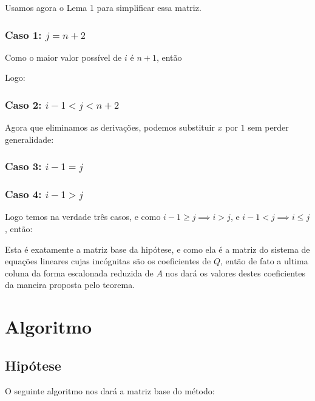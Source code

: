\documentclass[a4paper, 10pt]{article}
\begin{document}
Usamos agora o Lema 1 para simplificar essa matriz.

\pagebreak
\subsubsection{Caso 1: $j = n + 2$}

Como o maior valor poss\'ivel de $i$ \'e $n+1$, ent\~ao

\caseOneComparison

Logo:

\caseOneResult

\subsubsection{Caso 2: $i - 1 < j < n + 2$}

\caseTwoPartOne

Agora que eliminamos as deriva\c{c}\~oes, podemos substituir $x$ por $1$ sem perder generalidade:

\caseTwoPartTwo

\subsubsection{Caso 3: $i - 1 = j$}

\caseThree

\subsubsection{Caso 4: $i - 1 > j$}

\caseFour

Logo temos na verdade tr\^es casos, e como $i - 1 \geq j \implies i > j$, e $i - 1 < j \implies i \leq j$, ent\~ao:

\aijDef

Esta \'e exatamente a matriz base da hip\'otese, e como ela \'e a matriz do sistema de equa\c{c}\~oes lineares cujas inc\'ognitas s\~ao os coeficientes de $Q$, ent\~ao de fato a ultima coluna da forma escalonada reduzida de $A$ nos dar\'a os valores destes coeficientes da maneira proposta pelo teorema.

\pagebreak
\section{Algoritmo}

\subsection{Hip\'otese}
O seguinte algoritmo nos dar\'a a matriz base do m\'etodo:
\algorithm
\end{document}
